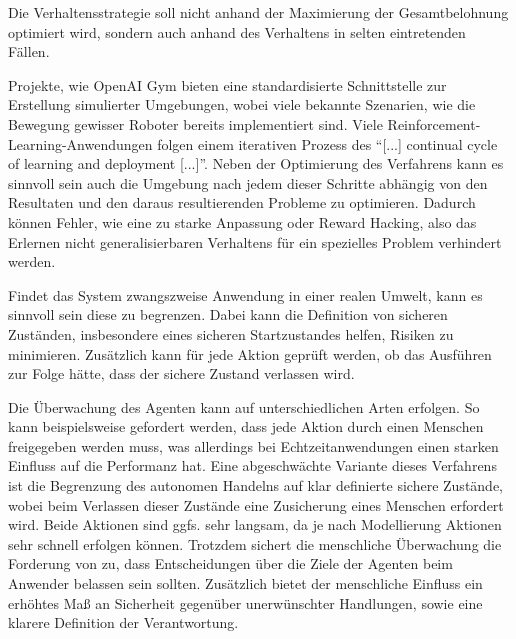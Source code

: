 \begin{description}
    \item {}
    Die Verhaltensstrategie soll nicht anhand der Maximierung der Gesamtbelohnung optimiert wird, sondern auch anhand des Verhaltens in selten eintretenden Fällen.
    \item {}
    Projekte, wie OpenAI Gym \cite{brockman2016} bieten eine standardisierte Schnittstelle zur Erstellung simulierter Umgebungen, wobei viele bekannte Szenarien, wie die Bewegung gewisser Roboter bereits implementiert sind.
    Viele Reinforcement-Learning-Anwendungen folgen einem iterativen Prozess des \enquote{[...] continual cycle of learning and deployment [...]}\cite[S. 15]{amodei2016}.
    Neben der Optimierung des Verfahrens kann es sinnvoll sein auch die Umgebung nach jedem dieser Schritte abhängig von den Resultaten und den daraus resultierenden Probleme zu optimieren.
    Dadurch können Fehler, wie eine zu starke Anpassung oder Reward Hacking, also das Erlernen nicht generalisierbaren Verhaltens für ein spezielles Problem verhindert werden.
    \item {}
    Findet das System zwangszweise Anwendung in einer realen Umwelt, kann es sinnvoll sein diese zu begrenzen.
    Dabei kann die Definition von sicheren Zuständen, insbesondere eines sicheren Startzustandes helfen, Risiken zu minimieren.
    Zusätzlich kann für jede Aktion geprüft werden, ob das Ausführen zur Folge hätte, dass der sichere Zustand verlassen wird.
    \item {}
    Die Überwachung des Agenten kann auf unterschiedlichen Arten erfolgen.
    So kann beispielsweise gefordert werden, dass jede Aktion durch einen Menschen freigegeben werden muss, was allerdings bei Echtzeitanwendungen einen starken Einfluss auf die Performanz hat. 
    Eine abgeschwächte Variante dieses Verfahrens ist die Begrenzung des autonomen Handelns auf klar definierte sichere Zustände, wobei beim Verlassen dieser Zustände eine Zusicherung eines Menschen erfordert wird.
    Beide Aktionen sind ggfs. sehr langsam, da je nach Modellierung Aktionen sehr schnell erfolgen können.
    Trotzdem sichert die menschliche Überwachung die Forderung von \cite{hellbardt1996} zu, dass Entscheidungen über die Ziele der Agenten beim Anwender belassen sein sollten.
    Zusätzlich bietet der menschliche Einfluss ein erhöhtes Maß an Sicherheit gegenüber unerwünschter Handlungen, sowie eine klarere Definition der Verantwortung.
\end{description}


